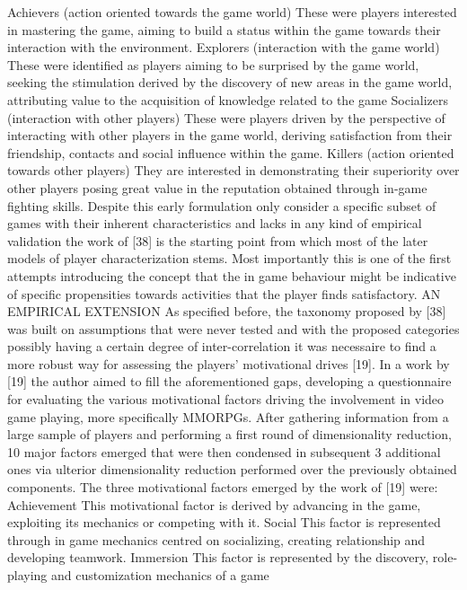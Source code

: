 Achievers (action oriented towards the game world)
These were players interested in mastering the game, aiming to build a status within the game towards their interaction with the environment.
Explorers (interaction with the game world) 		
These were identified as players aiming to be surprised by the game world, seeking the stimulation derived by the discovery of new areas in the game world, attributing value to the acquisition of knowledge related to the game
Socializers (interaction with other players)
These were players driven by the perspective of interacting with other players in the game world, deriving satisfaction from their friendship, contacts and social influence within the game.
Killers (action oriented towards other players)
They are interested in demonstrating their superiority over other players posing great value  in the reputation obtained through  in-game fighting skills.
Despite this early formulation only consider a specific subset of games with their inherent characteristics and lacks in any kind of empirical validation the work of [38] is the starting point from which most of the later models of player characterization stems. Most importantly this is one of the first attempts introducing the concept that the in game behaviour might be indicative of specific propensities towards activities that the player finds satisfactory.
AN EMPIRICAL EXTENSION
As specified before, the taxonomy proposed by [38] was built on assumptions that were never tested and with the proposed categories possibly having a certain degree of inter-correlation it was necessaire to find a more robust way for assessing the players’ motivational drives [19]. In a work by [19] the author aimed to fill the aforementioned gaps, developing a questionnaire for evaluating the various motivational factors driving the involvement in video game playing, more specifically MMORPGs. After gathering information from a large sample of players and performing a first round of dimensionality reduction, 10 major factors emerged that were then condensed in subsequent 3 additional ones via ulterior dimensionality reduction performed over the previously obtained components. The three motivational factors emerged by the work of [19] were:
Achievement
This motivational factor is derived by advancing in the game, exploiting its mechanics or competing with it.
Social
This factor is represented through in game mechanics centred on socializing, creating relationship and developing teamwork.
Immersion
This factor is represented by the discovery, role-playing and customization mechanics of a game
